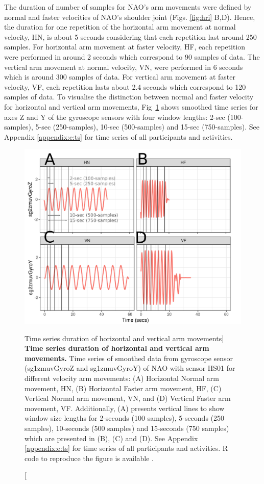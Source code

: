 The duration of number of samples for NAO's arm movements were defined by 
normal and faster velocities of NAO's shoulder joint (Figs. \ref{fig:hri} B,D). 
Hence, the duration for one repetition of the horizontal 
arm movement at normal velocity, HN, is about 5 seconds considering that 
each repetition last around 250 samples. For horizontal arm movement at 
faster velocity, HF, each repetition were performed in around 2 seconds 
which correspond to 90 samples of data. 
The vertical arm movement at normal velocity, VN, were performed  in 6 seconds 
which is around 300 samples of data.
For vertical arm movement at faster velocity, VF, each repetition lasts 
about 2.4 seconds which correspond to 120 samples of data.
To visualise the distinction between normal and faster velocity for horizontal 
and vertical arm movements, Fig~\ref{fig:sts} shows smoothed time series 
for axes Z and Y of the gyroscope sensors with four window lengths: 
2-sec (100-samples), 5-sec (250-samples), 10-sec (500-samples) 
and 15-sec (750-samples).
See Appendix \ref{appendix:e:ts} for 
time series of all participants and activities. 
\begin{figure}
  \centering
  \includegraphics[width=1.0\textwidth]{fig_4_04}
    \caption
	[Time series duration of horizontal and vertical arm movements]{
	{\bf Time series duration of horizontal and vertical arm movements.} 
		Time series of smoothed data from gyroscope sensor 
		(sg1zmuvGyroZ and sg1zmuvGyroY) of NAO 
		with sensor HS01 for different velocity arm movements: 
		(A) Horizontal Normal arm movement, HN, 
		(B) Horizontal Faster arm movement, HF,
		(C) Vertical Normal arm movement, VN, and 
		(D) Vertical Faster arm movement, VF.
		Additionally, (A) presents vertical lines 
		to show window size lengths for 2-seconds 
		(100 samples), 5-seconds (250 samples), 
		10-seconds (500 samples) and 15-seconds (750 samples)
		which are presented in (B), (C) and (D).
		See Appendix \ref{appendix:e:ts} for 
		time series of all participants and activities. 
		R code to reproduce the figure is available \cite{xochicale2018}.
        }
	\label{fig:sts}
\end{figure}

